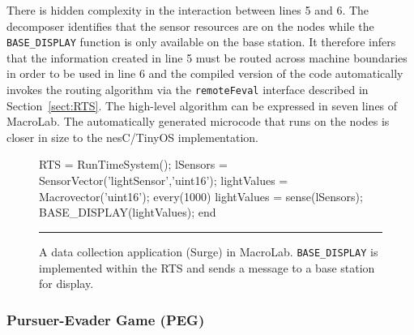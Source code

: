 There is hidden complexity in the interaction between lines 5 and 6. The
decomposer identifies that the sensor resources are on the nodes while
the {\tt BASE\_DISPLAY} function is only available on the base station.  It
therefore infers that the information created in line 5 must be routed
across machine boundaries in order to be used in line 6 and the
compiled version of the code automatically invokes the routing algorithm
via the {\tt remoteFeval} interface described in Section~\ref{sect:RTS}.
The high-level algorithm can be expressed in seven lines of MacroLab. 
The automatically generated microcode that runs on the nodes is closer
in size to the nesC/TinyOS implementation. 

\begin{figure}
  \begin{macrolab}
RTS = RunTimeSystem();
lSensors = SensorVector('lightSensor','uint16');
lightValues = Macrovector('uint16');
every(1000)
  lightValues =  sense(lSensors);
  BASE_DISPLAY(lightValues);
end
  \end{macrolab}
  \smallskip
  \hrule width 1\columnwidth
  \caption[MacroLab implementation of Surge]{A data collection application
    (Surge) in MacroLab.  {\tt BASE\_DISPLAY} is implemented within the RTS and
    sends a message to a base station for display.}
  \label{code:Surge}
\end{figure}

\subsubsection{Pursuer-Evader Game (PEG)}\label{sect:peg}

